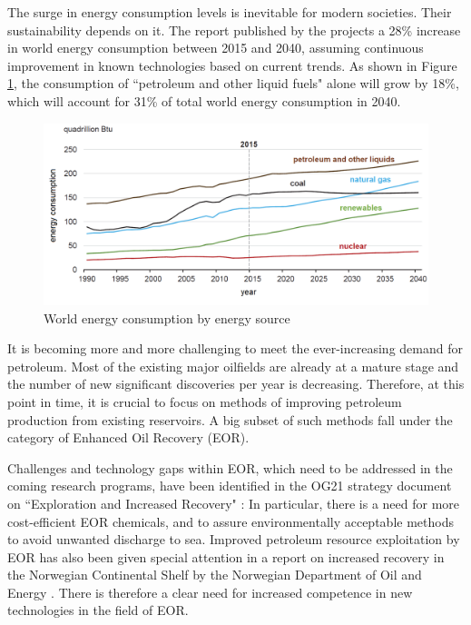 The surge in energy consumption levels is inevitable for modern societies. Their sustainability depends on it. The  report \citeyearpar{EIA2017} published by the  projects a 28\% increase in world energy consumption between 2015 and 2040, assuming continuous improvement in known technologies based on current trends. As shown in Figure \ref{cht:energySources}, the consumption of ``petroleum and other liquid fuels" alone will grow by 18\%, which will account for 31\% of total world energy consumption in 2040.

\begin{figure}[b!]
    \centering
    \includegraphics[width=\textwidth]{img/cht/chtEiaEnergy.png}
    \caption{World energy consumption by energy source \citep{EIA2017}}
    \label{cht:energySources}
\end{figure}

It is becoming more and more challenging to meet the ever-increasing demand for petroleum. Most of the existing major oilfields are already at a mature stage and the number of new significant discoveries per year is decreasing. Therefore, at this point in time, it is crucial to focus on methods of improving petroleum production from existing reservoirs. A big subset of such methods fall under the category of Enhanced Oil Recovery (EOR).

Challenges and technology gaps within EOR,  which need to be addressed in the coming research programs, have been identified in the OG21 strategy document on ``Exploration and Increased Recovery" \citep{OG21}: In particular, there is a need for more cost-efficient EOR chemicals, and to assure environmentally acceptable methods to avoid unwanted discharge to sea. Improved petroleum resource exploitation by EOR has also been given special attention in a report on increased recovery in the Norwegian Continental Shelf by the Norwegian Department of Oil and Energy \citep{Am2010}. There is therefore a clear need for increased competence in new technologies in the field of EOR. 

